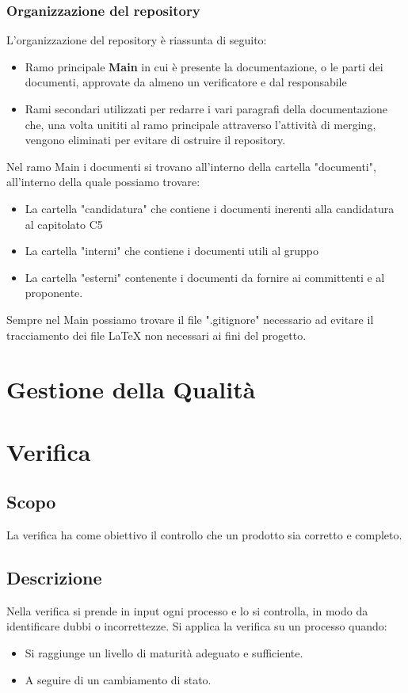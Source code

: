   \subsubsection{Organizzazione del repository}
  L'organizzazione del repository è riassunta di seguito:
  \begin{itemize}
      \item Ramo principale \textbf{Main} in cui è presente la documentazione, o le parti dei documenti, approvate da almeno un verificatore e dal responsabile
      \item Rami secondari utilizzati per redarre i vari paragrafi della documentazione che, una volta unititi al ramo principale attraverso l'attività di merging, vengono eliminati per evitare di ostruire il repository.
  \end{itemize}
  Nel ramo Main i documenti si trovano all'interno della cartella "documenti", all'interno della quale possiamo trovare:
  \begin{itemize}
      \item La cartella "candidatura" che contiene i documenti inerenti alla candidatura al capitolato C5
      \item La cartella "interni" che contiene i documenti utili al gruppo
      \item La cartella "esterni" contenente i documenti da fornire ai committenti e al proponente.
  \end{itemize}
  Sempre nel Main possiamo trovare il file ".gitignore" necessario ad evitare il tracciamento dei file \LaTeX{} non necessari ai fini del progetto.


\section{Gestione della Qualità}

\section{Verifica}
\subsection{Scopo}
La verifica ha come obiettivo il controllo che un prodotto sia corretto e completo.

\subsection{Descrizione}
Nella verifica si prende in input ogni processo e lo si controlla, in modo da identificare dubbi o incorrettezze.
Si applica la verifica su un processo quando:
\begin{itemize}
  \item Si raggiunge un livello di maturità adeguato e sufficiente.
  \item A seguire di un cambiamento di stato.
\end{itemize}


